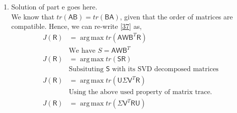 \documentclass[a4paper, 11pt]{article}
\newcommand{\mat}[1]{\boldsymbol { \mathsf{#1}} }
\DeclareMathOperator*{\argmax}{arg\,max}
\begin{document}
\begin{enumerate}[label=\alph*.]
\begin{align}
\begin{matrix}
            \omega_1 \vec \beta_1 \mat R \vec \alpha_1 & \omega_1 \vec \beta_1 \mat R \vec \alpha_2 & \ldots & \omega_1 \vec \beta_1 \mat R \vec \alpha_n\\
            \omega_2 \vec \beta_2 \mat R \vec \alpha_1 & \omega_2 \vec \beta_2 \mat R \vec \alpha_2 & \ldots & \omega_2 \vec \beta_2 \mat R \vec \alpha_n\\
            \vdots & \vdots & \ddots & \vdots \\
            \omega_n \vec \beta_n \mat R \vec \alpha_1 & \omega_n \vec \beta_n \mat R \vec \alpha_2 & \ldots & \omega_n \vec \beta_n \mat R \vec \alpha_n\\
        \end{matrix} \right]\\
        tr(\mat W \mat B^T \mat R \mat A) & = \omega_1 \vec \beta_1 \mat R \vec \alpha_1 + \omega_2 \vec \beta_2 \mat R \vec \alpha_2 + \ldots + \omega_n \vec \beta_n \mat R \vec \alpha_n \\
        tr(\mat W \mat B^T \mat R \mat A) & = \sum_{i=1}^n \omega_i \vec \beta_i \mat R \vec \alpha_i
    \end{align}
    
    Hence, Eq \eqref{24} can be written as:
    
    \begin{align}
        J(\mat R) &= \argmax tr(\mat W \mat B^T \mat R \mat A) \label{37}
    \end{align}
    
    
    
    
    
    
    \item
    Solution of part e goes here.\\
    We know that $tr(\mat A \mat B) = tr(\mat B \mat A)$, given that the order of matrices are compatible. Hence, we can re-write \eqref{37} as,
    \begin{align}
        J(\mat R) &= \argmax tr(\mat A \mat W \mat B^T \mat R )\\
        & \text{We have $S = \mat A \mat W \mat B^T$}\nonumber\\
        J(\mat R) &= \argmax tr(\mat S \mat R )\\\
        & \text{Subsituting $\mat S$ with its SVD decomposed matrices}\nonumber\\
        J(\mat R) &= \argmax tr(\mat U \mat \Sigma \mat V^T \mat R )\\
        & \text{Using the above used property of matrix trace.}\nonumber\\
        J(\mat R) &= \argmax tr(\mat \Sigma \mat V^T \mat R \mat U)\label{41}
    \end{align}
    

\end{enumerate}
\end{document}
